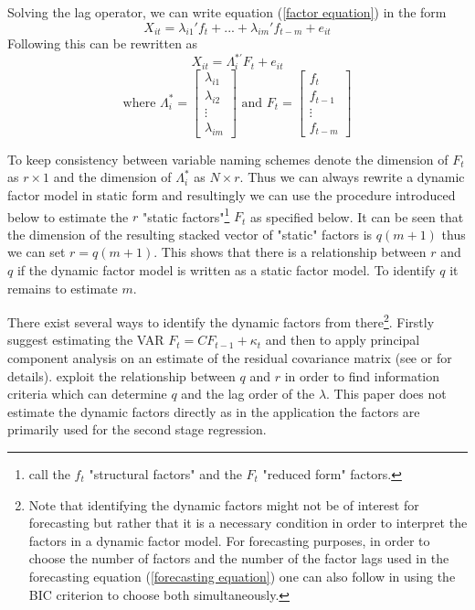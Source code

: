 \documentclass[11pt]{article}
\begin{document}
Solving the lag operator, we can write equation (\ref{factor equation}) in the form 
\begin{equation}
	\label{factor equation, solved lag polynomial}
	X_{it} = \lambda_{i1}' f_t + ... + \lambda_{im}' f_{t-m} + e_{it}
\end{equation}
Following \citet{bai2002determining} this can be rewritten as 
$$X_{it} = \Lambda_i^{*'} F_t + e_{it}$$
$$\text{where } \Lambda_i^* = \begin{bmatrix} \lambda_{i1} \\ \lambda_{i2} \\ \vdots \\ \lambda_{im} \end{bmatrix} \text{ and } F_t = \begin{bmatrix} f_t \\ f_{t-1} \\ \vdots \\ f_{t-m} \end{bmatrix}$$

To keep consistency between variable naming schemes denote the dimension of $F_t$ as $r \times 1$ and the dimension of $\Lambda_i^*$ as $N \times r$. Thus we can always rewrite a dynamic factor model in static form and resultingly we can use the procedure introduced below to estimate the $r$ "static factors"\footnote{\citet{breitung2004identification} call the $f_t$ "structural factors" and the $F_t$ "reduced form" factors.} $F_t$ as specified below.
It can be seen that the dimension of the resulting stacked vector of "static" factors is $q(m+1)$ thus we can set $r=q(m+1)$. This shows that there is a relationship between $r$ and $q$ if the dynamic factor model is written as a static factor model. To identify $q$ it remains to estimate $m$.

There exist several ways to identify the dynamic factors from there\footnote{Note that identifying the dynamic factors might not be of interest for forecasting but rather that it is a necessary condition in order to interpret the factors in a dynamic factor model. For forecasting purposes, in order to choose the number of factors and the number of the factor lags used in the forecasting equation (\ref{forecasting equation}) one can also follow \citet{bai2008forecasting} in using the BIC criterion to choose both simultaneously. }. Firstly \citet{giannone2002tracking} suggest estimating the VAR $F_t = C F_{t-1} + \kappa_t$ and then to apply principal component analysis on an estimate of the residual covariance matrix (see \citet{breitung2004identification} or \citet{giannone2002tracking} for details). \citet{breitung2004identification} exploit the relationship between $q$ and $r$ in order to find information criteria which can determine $q$ and the lag order of the $\lambda$. This paper does not estimate the dynamic factors directly as in the application the factors are primarily used for the second stage regression. \\
\end{document}
